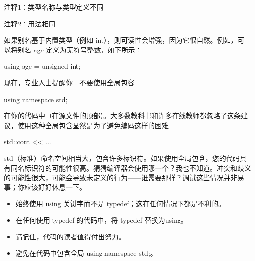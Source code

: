 {\footnotesize
注释1：类型名称与类型定义不同

注释2：用法相同
}

如果别名基于内置类型（例如 int），则可读性会增强，因为它很自然。例如，可以将别名 age 定义为无符号整数，如下所示：

\begin{cpp}
using age = unsigned int;
\end{cpp}

现在，专业人士提醒你：不要使用全局包容

\begin{cpp}
using namespace std;
\end{cpp}

在你的代码中（在源文件的顶部）。大多数教科书和许多在线教师都忽略了这条建议，使用这种全局包含显然是为了避免编码这样的困难

\begin{cpp}
std::cout << ...
\end{cpp}

std（标准）命名空间相当大，包含许多标识符。如果使用全局包含，您的代码具有同名标识符的可能性很高。猜猜编译器会使用哪一个？我也不知道。冲突和歧义的可能性很大，可能会导致未定义的行为——谁需要那样？调试这些情况并非易事；你应该好好休息一下。


\begin{itemize}
\item
始终使用 using 关键字而不是 typedef；这在任何情况下都是不利的。

\item
在任何使用 typedef 的代码中，将 typedef 替换为using。

\item
请记住，代码的读者值得付出努力。

\item
避免在代码中包含全局 using namespace std;。
\end{itemize}
